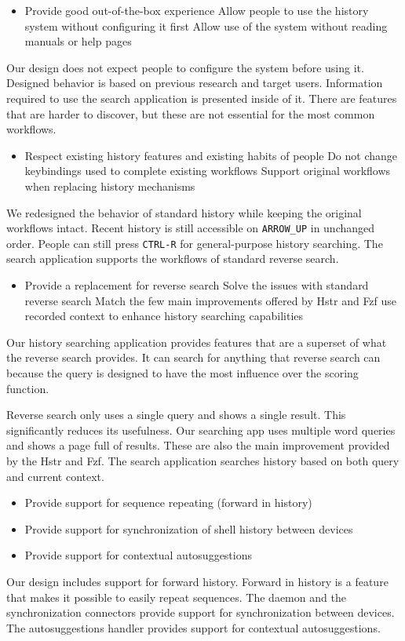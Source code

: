 \begin{itemize}
\item Provide good out-of-the-box experience 
\subitem Allow people to use the history system without configuring it first
\subitem Allow use of the system without reading manuals or help pages
\end{itemize}
Our design does not expect people to configure the system before using it. Designed behavior is based on previous research and target users. Information required to use the search application is presented inside of it. There are features that are harder to discover, but these are not essential for the most common workflows. 
\begin{itemize}
\item Respect existing history features and existing habits of people
\subitem Do not change keybindings used to complete existing workflows
\subitem Support original workflows when replacing history mechanisms
\end{itemize}
We redesigned the behavior of standard history while keeping the original workflows intact. Recent history is still accessible on \verb|ARROW_UP| in unchanged order. People can still press \verb|CTRL-R| for general-purpose history searching. 
The search application supports the workflows of standard reverse search.
\begin{itemize}
\item Provide a replacement for reverse search
\subitem Solve the issues with standard reverse search
\subitem Match the few main improvements offered by Hstr and Fzf
\subitem use recorded context to enhance history searching capabilities
\end{itemize}
Our history searching application provides features that are a superset of what the reverse search provides. It can search for anything that reverse search can because the query is designed to have the most influence over the scoring function.

Reverse search only uses a single query and shows a single result. This significantly reduces its usefulness. Our searching app uses multiple word queries and shows a page full of results. These are also the main improvement provided by the Hstr and Fzf.
The search application searches history based on both query and current context.

\begin{itemize}
\item Provide support for sequence repeating (forward in history)
\item Provide support for synchronization of shell history between devices
\item Provide support for contextual autosuggestions
\end{itemize}
Our design includes support for forward history. Forward in history is a feature that makes it possible to easily repeat sequences. 
The daemon and the synchronization connectors provide support for synchronization between devices. The autosuggestions handler provides support for contextual autosuggestions.

